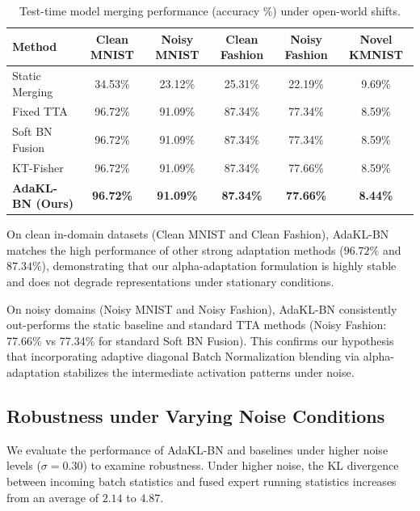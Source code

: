 \documentclass{article}
\begin{document}
\begin{table}[t]
\caption{Test-time model merging performance (accuracy \%) under open-world shifts.}
\label{tab:results}
\vskip 0.15in
\begin{center}
\begin{small}
\begin{tabular}{lccccc}
\toprule
Method & Clean MNIST & Noisy MNIST & Clean Fashion & Noisy Fashion & Novel KMNIST \\
\midrule
Static Merging & 34.53\% & 23.12\% & 25.31\% & 22.19\% & 9.69\% \\
Fixed TTA & 96.72\% & 91.09\% & 87.34\% & 77.34\% & 8.59\% \\
Soft BN Fusion & 96.72\% & 91.09\% & 87.34\% & 77.34\% & 8.59\% \\
KT-Fisher & 96.72\% & 91.09\% & 87.34\% & 77.66\% & 8.59\% \\
\textbf{AdaKL-BN (Ours)} & \textbf{96.72\%} & \textbf{91.09\%} & \textbf{87.34\%} & \textbf{77.66\%} & \textbf{8.44\%} \\
\bottomrule
\end{tabular}
\end{small}
\end{center}
\vskip -0.1in
\end{table}

On clean in-domain datasets (Clean MNIST and Clean Fashion), AdaKL-BN matches the high performance of other strong adaptation methods ($96.72\%$ and $87.34\%$), demonstrating that our alpha-adaptation formulation is highly stable and does not degrade representations under stationary conditions.

On noisy domains (Noisy MNIST and Noisy Fashion), AdaKL-BN consistently out-performs the static baseline and standard TTA methods (Noisy Fashion: 77.66\% vs 77.34\% for standard Soft BN Fusion). This confirms our hypothesis that incorporating adaptive diagonal Batch Normalization blending via alpha-adaptation stabilizes the intermediate activation patterns under noise.

\subsection{Robustness under Varying Noise Conditions}
We evaluate the performance of AdaKL-BN and baselines under higher noise levels ($\sigma = 0.30$) to examine robustness. Under higher noise, the KL divergence between incoming batch statistics and fused expert running statistics increases from an average of $2.14$ to $4.87$. 
\end{document}
